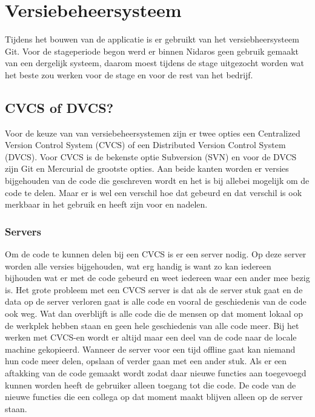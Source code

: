 \documentclass[a4paper,11pt,oneside]{report}
\begin{document}


\chapter{Versiebeheersysteem}
Tijdens het bouwen van de applicatie is er gebruikt van het versiebheersysteem
Git. Voor de stageperiode begon werd er binnen Nidaros geen gebruik gemaakt van
een dergelijk systeem, daarom moest tijdens de stage uitgezocht worden wat het
beste zou werken voor de stage en voor de rest van het bedrijf.

\section{CVCS of DVCS?}
Voor de keuze van van versiebeheersystemen zijn er twee opties een Centralized
Version Control System (CVCS) of een Distributed Version Control System (DVCS).
Voor CVCS is de bekenste optie Subversion (SVN) en voor de DVCS zijn Git en
Mercurial de grootste opties. Aan beide kanten worden er versies bijgehouden van
de code die geschreven wordt en het is bij allebei mogelijk om de code te delen.
Maar er is wel een verschil hoe dat gebeurd en dat verschil is ook merkbaar in
het gebruik en heeft zijn voor en nadelen.

\subsection{Servers} \label{Servers}
Om de code te kunnen delen bij een CVCS is er een server nodig. Op deze server
worden alle versies bijgehouden, wat erg handig is want zo kan iedereen
bijhouden wat er met de code gebeurd en weet iedereen waar een ander mee bezig
is. Het grote probleem met een CVCS server is dat als de server stuk gaat en de
data op de server verloren gaat is alle code en vooral de geschiedenis van de
code ook weg. Wat dan overblijft is alle code die de mensen op dat moment lokaal
op de werkplek hebben staan en geen hele geschiedenis van alle code meer. Bij
het werken met CVCS-en wordt er altijd maar een deel van de code naar de locale
machine gekopieerd. Wanneer de server voor een tijd offline gaat kan niemand hun
code meer delen, opslaan of verder gaan met een ander stuk. Als er een aftakking
van de code gemaakt wordt zodat daar nieuwe functies aan toegevoegd kunnen
worden heeft de gebruiker alleen toegang tot die code. De code van de nieuwe
functies die een collega op dat moment maakt blijven alleen op de server staan.
\end{document}

